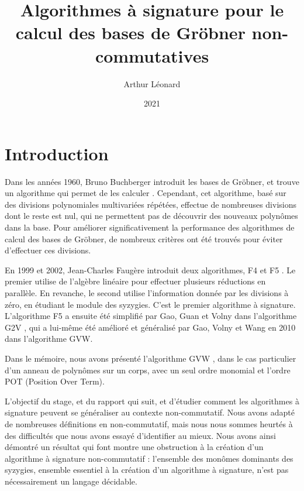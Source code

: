 \documentclass{article}
\title{Algorithmes à signature pour le calcul des bases de Gröbner non-commutatives}
\author{Arthur Léonard}
\date{2021}
\begin{document}
\maketitle

\section*{Introduction}
Dans les années 1960, Bruno Buchberger introduit les bases de Gröbner, et trouve un algorithme qui permet de les calculer \cite{buchberger}. Cependant, cet algorithme, basé sur des divisions polynomiales multivariées répétées, effectue de nombreuses divisions dont le reste est nul, qui ne permettent pas de découvrir des nouveaux polynômes dans la base. Pour améliorer significativement la performance des algorithmes de calcul des bases de Gröbner, de nombreux critères ont été trouvés pour éviter d'effectuer ces divisions.

En 1999 et 2002, Jean-Charles Faugère introduit deux algorithmes, F4 \cite{f4} et F5 \cite{f5}. Le premier utilise de l'algèbre linéaire pour effectuer plusieurs réductions en parallèle. En revanche, le second utilise l'information donnée par les divisions à zéro, en étudiant le module des syzygies. C'est le premier algorithme à signature. L'algorithme F5 a ensuite été simplifié par Gao, Guan et Volny dans l'algorithme G2V \cite{g2v}, qui a lui-même été amélioré et généralisé par Gao, Volny et Wang en 2010 dans l'algorithme GVW.

Dans le mémoire, nous avons présenté l'algorithme GVW \cite{gvw}, dans le cas particulier d'un anneau de polynômes sur un corps, avec un seul ordre monomial et l'ordre POT (Position Over Term).

L'objectif du stage, et du rapport qui suit, et d'étudier comment les algorithmes à signature peuvent se généraliser au contexte non-commutatif. Nous avons adapté de nombreuses définitions en non-commutatif, mais nous nous sommes heurtés à des difficultés que nous avons essayé d'identifier au mieux. Nous avons ainsi démontré un résultat qui font montre une obstruction à la création d'un algorithme à signature non-commutatif : l'ensemble des monômes dominants des syzygies, ensemble essentiel à la création d'un algorithme à signature, n'est pas nécessairement un langage décidable.
\end{document}
